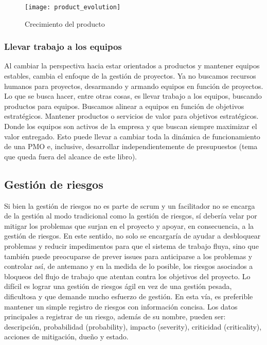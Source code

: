 \begin{figure}[h]
  \centering
  \texttt{[image: product\_evolution]}
  \caption{Crecimiento del producto}
  \centering
  \label{fig:product_evolution} %
\end{figure}

\subsubsection{Llevar trabajo a los equipos}

Al cambiar la perspectiva hacia estar orientados a productos y mantener equipos estables, cambia el enfoque de la gestión de proyectos. Ya no buscamos recursos humanos para proyectos, desarmando y armando equipos en función de proyectos. Lo que se busca hacer, entre otras cosas, es llevar trabajo a los equipos, buscando productos para equipos. Buscamos alinear a equipos en función de objetivos estratégicos. Mantener productos o servicios de valor para objetivos estratégicos. Donde los equipos son activos de la empresa y que buscan siempre maximizar el valor entregado. Esto puede llevar a cambiar toda la dinámica de funcionamiento de una PMO e, inclusive, desarrollar independientemente de presupuestos (tema que queda fuera del alcance de este libro).


\subsection{Gestión de riesgos}

Si bien la gestión de riesgos no es parte de scrum y un facilitador no se encarga de la gestión al modo tradicional como la gestión de riesgos, sí debería velar por mitigar los problemas que surjan en el proyecto y apoyar, en consecuencia, a la gestión de riesgos. En este sentido, no solo se encargaría de ayudar a desbloquear problemas y reducir impedimentos para que el sistema de trabajo fluya, sino que también puede preocuparse de prever issues para anticiparse a los problemas y controlar así, de antemano y en la medida de lo posible, los riesgos asociados a bloqueos del flujo de trabajo que atentan contra los objetivos del proyecto. Lo difícil es lograr una gestión de riesgos ágil en vez de una gestión pesada, dificultosa y que demande mucho esfuerzo de gestión. En esta vía, es preferible mantener un simple registro de riesgos con información concisa. Los datos principales a registrar de un riesgo, además de su nombre, pueden ser: descripción, probabilidad (probability), impacto (severity), criticidad (criticality), acciones de mitigación, dueño y estado.

